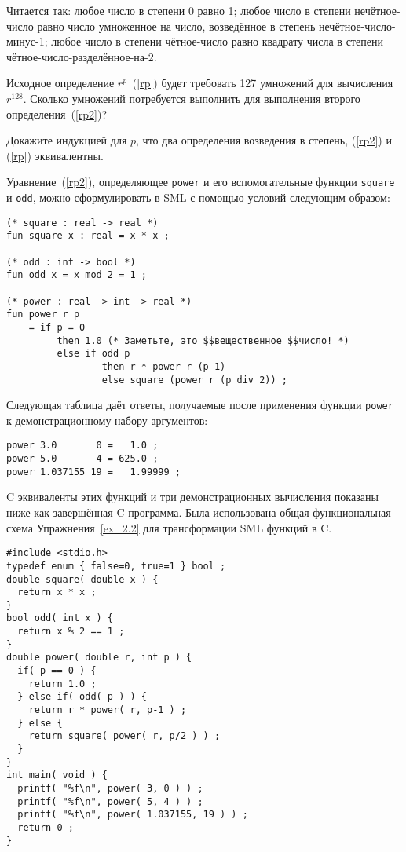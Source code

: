 Читается так: любое число в степени 0 равно 1; любое число в степени нечётное-число равно число умноженное на число, возведённое в степень нечётное-число-минус-1; любое число в степени чётное-число равно квадрату числа в степени чётное-число-разделённое-на-2.

\exercise Исходное определение $r^p$~(\ref{rp}) будет требовать 127 умножений для вычисления $r^{128}$. Сколько умножений потребуется выполнить для выполнения второго определения~(\ref{rp2})?\label{ex_2.6}

\exercise Докажите индукцией для $p$, что два определения возведения в степень, (\ref{rp2}) и (\ref{rp}) эквивалентны.\label{ex_2.7}

Уравнение~(\ref{rp2}), определяющее \lstinline|power| и его вспомогательные функции \lstinline|square| и \lstinline|odd|, можно сформулировать в SML с помощью условий следующим образом:

\begin{lstlisting}[style=customml]
(* square : real -> real *)
fun square x : real = x * x ;

(* odd : int -> bool *)
fun odd x = x mod 2 = 1 ;

(* power : real -> int -> real *)
fun power r p
    = if p = 0
         then 1.0 (* Заметьте, это $$вещественное $$число! *)
         else if odd p
                 then r * power r (p-1)
                 else square (power r (p div 2)) ;
\end{lstlisting}

Следующая таблица даёт ответы, получаемые после применения функции \lstinline|power| к демонстрационному набору аргументов:

\begin{lstlisting}
power 3.0       0 =   1.0 ;
power 5.0       4 = 625.0 ;
power 1.037155 19 =   1.99999 ;
\end{lstlisting}

C эквиваленты этих функций и три демонстрационных вычисления показаны ниже как завершённая C программа. Была использована общая функциональная схема Упражнения~\ref{ex_2.2} для трансформации SML функций в C.

\begin{lstlisting}
#include <stdio.h>
typedef enum { false=0, true=1 } bool ;
double square( double x ) {
  return x * x ;
}
bool odd( int x ) {
  return x % 2 == 1 ;
}
double power( double r, int p ) {
  if( p == 0 ) {
    return 1.0 ;
  } else if( odd( p ) ) {
    return r * power( r, p-1 ) ;
  } else {
    return square( power( r, p/2 ) ) ;
  }
}
int main( void ) {
  printf( "%f\n", power( 3, 0 ) ) ;
  printf( "%f\n", power( 5, 4 ) ) ;
  printf( "%f\n", power( 1.037155, 19 ) ) ;
  return 0 ;
}
\end{lstlisting}

